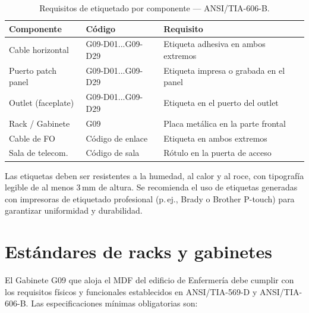 \begin{table}[H]
    \centering
    \caption{Requisitos de etiquetado por componente — ANSI/TIA-606-B.}
    \label{tab:etiquetado}
    \begin{tabular}{|p{4cm}|p{4.5cm}|p{5cm}|}
        \hline
        \textbf{Componente} & \textbf{Código} & \textbf{Requisito} \\
        \hline
        Cable horizontal & G09-D01...G09-D29 &
        Etiqueta adhesiva en ambos extremos \\
        \hline
        Puerto patch panel & G09-D01...G09-D29 &
        Etiqueta impresa o grabada en el panel \\
        \hline
        Outlet (faceplate) & G09-D01...G09-D29 &
        Etiqueta en el puerto del outlet \\
        \hline
        Rack / Gabinete & G09 &
        Placa metálica en la parte frontal \\
        \hline
        Cable de FO & Código de enlace &
        Etiqueta en ambos extremos \\
        \hline
        Sala de telecom.\ & Código de sala &
        Rótulo en la puerta de acceso \\
        \hline
    \end{tabular}
\end{table}%
\nobreak\vspace{-0.3cm}
Las etiquetas deben ser resistentes a la humedad, al calor y al roce, con
tipografía legible de al menos 3\,mm de altura. Se recomienda el uso de
etiquetas generadas con impresoras de etiquetado profesional (p.\,ej.,
Brady o Brother P-touch) para garantizar uniformidad y durabilidad.

\section{Estándares de racks y gabinetes}
\label{sec:racks}

El Gabinete G09 que aloja el MDF del edificio de Enfermería debe cumplir con
los requisitos físicos y funcionales establecidos en \mbox{ANSI/TIA-569-D} y
\mbox{ANSI/TIA-606-B}. Las especificaciones mínimas obligatorias son:

